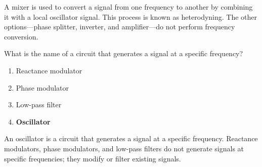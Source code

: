 A mixer is used to convert a signal from one frequency to another by combining it with a local oscillator signal. This process is known as heterodyning. The other options—phase splitter, inverter, and amplifier—do not perform frequency conversion.

\begin{tcolorbox}[colback=gray!10!white,colframe=black!75!black,title={T7A05}]
    What is the name of a circuit that generates a signal at a specific frequency?
    \begin{enumerate}[label=\Alph*),noitemsep]
        \item Reactance modulator
        \item Phase modulator
        \item Low-pass filter
        \item \textbf{Oscillator}
    \end{enumerate}
\end{tcolorbox}

An oscillator is a circuit that generates a signal at a specific frequency. Reactance modulators, phase modulators, and low-pass filters do not generate signals at specific frequencies; they modify or filter existing signals.

